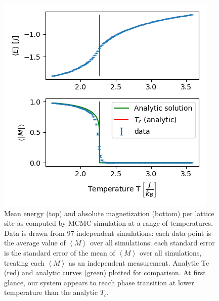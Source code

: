 \documentclass[letter,scriptaddress,twocolumn, prl]{revtex4}
\begin{document}
\begin{figure}[h]
	\begin{center}
		\includegraphics[width=.5\textwidth]{figs/fig2_EMplots.png}
		\caption{Mean energy (top) and absolute magnetization (bottom) per lattice site as computed by MCMC simulation at a range of temperatures. Data is drawn from 97 independent simulations: each data point is the average value of $\left\langle M \right\rangle$ over all simulations; each standard error is the standard error of the mean of $\left\langle M \right\rangle$ over all simulations, treating each $\left\langle M \right\rangle$ as an independent measurement. Analytic Tc (red) and analytic curves (green) plotted for comparison. At first glance, our system appears to reach phase transition at lower temperature than the analytic $T_c$.}
		\label{fig:fig2}
	\end{center}
\end{figure}
\end{document}
